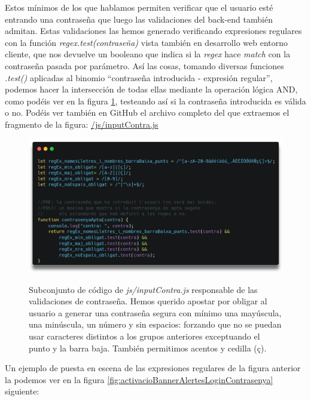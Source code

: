 \documentclass[a4paper,12pt]{report}
\begin{document}
		Estos mínimos de los que hablamos permiten verificar que el usuario esté entrando una contraseña que luego las validaciones del back-end también admitan. Estas validaciones las hemos generado verificando expresiones regulares con la función \textit{regex.test(contraseña)} vista también en desarrollo web entorno cliente, que nos devuelve un booleano que indica si la \textit{regex} hace \textit{match} con la contraseña pasada por parámetro. Así las cosas, tomando diversas funciones \textit{.test()} aplicadas al binomio ``contraseña introducida - expresión regular'', podemos hacer la intersección de todas ellas mediante la operación lógica AND, como podéis ver en la figura \ref{fig:contrasenyaValidacioExprRegulars}, testeando así si la contraseña introducida es válida o no. Podéis ver también en GitHub el archivo completo del que extraemos el fragmento de la figura:  \href{https://github.com/blackcub3s/mercApp/blob/main/APP%20WEB/__frontend__produccio__/app/js/inputContra.js}{/js/inputContra.js}
		
		
		\FloatBarrier
		\setlength{\belowcaptionskip}{3pt}
		\begin{figure}[H]
			\centering
			\caption{Subconjunto de código de \textit{js/inputContra.js} responsable de las validaciones de contraseña. Hemos querido apostar por obligar al usuario a generar una contraseña segura con mínimo una mayúscula, una minúscula, un número y sin espacios: forzando que no se puedan usar caracteres distintos a los grupos anteriores exceptuando el punto y la barra baja. También permitimos acentos y cedilla (ç).}
			\includegraphics[width=.7\linewidth]{img/contrasenyaValidacioExprRegulars}
			\label{fig:contrasenyaValidacioExprRegulars}
		\end{figure}
		\FloatBarrier
		
		
		
		
		Un ejemplo de puesta en escena de las expresiones regulares de la figura anterior la podemos ver en la figura \ref{fig:activacioBannerAlertesLoginContrasenya} siguiente:
	
\end{document}
